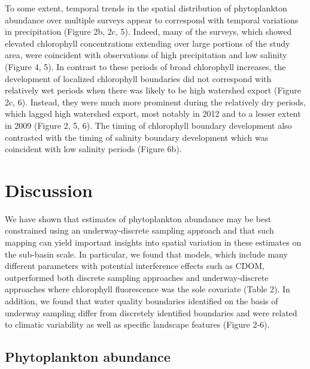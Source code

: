 \documentclass[review]{elsarticle}
\begin{document}
To some extent, temporal trends in the spatial distribution of phytoplankton abundance over multiple surveys appear to correspond with temporal variations in precipitation (Figure 2b, 2c, 5). Indeed, many of the surveys, which showed elevated chlorophyll concentrations extending over large portions of the study area, were coincident with observations of high precipitation and low salinity (Figure 4, 5). In contrast to these periods of broad chlorophyll increases, the development of localized chlorophyll boundaries did not correspond with relatively wet periods when there was likely to be high watershed export (Figure 2c, 6). Instead, they were much more prominent during the relatively dry periods, which lagged high watershed export, most notably in 2012 and to a lesser extent in 2009 (Figure 2, 5, 6). The timing of chlorophyll boundary development also contrasted with the timing of salinity boundary development which was coincident with low salinity periods (Figure 6b).

\section{Discussion}

We have shown that estimates of phytoplankton abundance may be best constrained using an underway-discrete sampling approach and that such mapping can yield important insights into spatial variation in these estimates on the sub-basin scale. In particular, we found that models, which include many different parameters with potential interference effects such as CDOM, outperformed both discrete sampling approaches and underway-discrete approaches where chlorophyll fluorescence was the sole covariate (Table 2). In addition, we found that water quality boundaries identified on the basis of underway sampling differ from discretely identified boundaries and were related to climatic variability as well as specific landscape features (Figure 2-6).

\subsection{Phytoplankton abundance}
\end{document}
